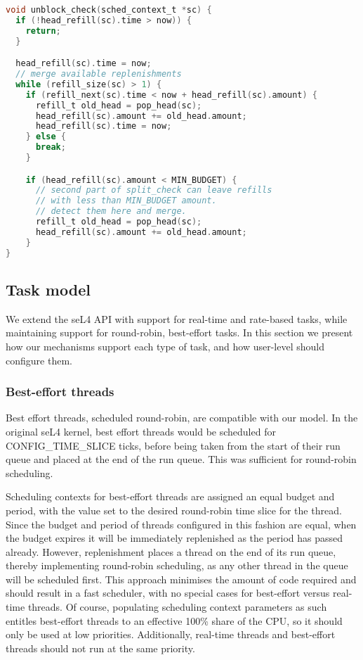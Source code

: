 \begin{lstlisting}[frame=single,language=c,caption=Unblock check routine.,label=list:unblock-check,float=htpb]
void unblock_check(sched_context_t *sc) {
  if (!head_refill(sc).time > now)) {
    return;
  }

  head_refill(sc).time = now;
  // merge available replenishments
  while (refill_size(sc) > 1) {
    if (refill_next(sc).time < now + head_refill(sc).amount) {
      refill_t old_head = pop_head(sc);
      head_refill(sc).amount += old_head.amount;
      head_refill(sc).time = now;
    } else {
      break;
    }

    if (head_refill(sc).amount < MIN_BUDGET) {
      // second part of split_check can leave refills
      // with less than MIN_BUDGET amount.
      // detect them here and merge.
      refill_t old_head = pop_head(sc);
      head_refill(sc).amount += old_head.amount;
    }
}
\end{lstlisting}


\subsection{Task model}

We extend the seL4 API with support for real-time and rate-based tasks, while maintaining support for round-robin, best-effort tasks.
In this section we present how our mechanisms support each type of task, and how user-level should configure them.

\subsubsection{Best-effort threads}

Best effort threads, scheduled round-robin, are compatible with our model.
In the original seL4 kernel, best effort threads would be scheduled for CONFIG\_TIME\_SLICE ticks, before being taken from the start of their run queue and placed at the end of the run queue.
This was sufficient for round-robin scheduling.

Scheduling contexts for best-effort threads are assigned an equal budget and period, with the value set to the desired round-robin time slice for the thread.
Since the budget and period of threads configured in this fashion are equal, when the budget expires it will be immediately replenished as the period has passed already.
However, replenishment places a thread on the end of its run queue, thereby implementing round-robin scheduling, as any other thread in the queue will be scheduled first.
This approach minimises the amount of code required and should result in a fast scheduler, with no special cases for best-effort versus real-time threads.
Of course, populating scheduling context parameters as such entitles best-effort threads to an effective 100\% share of the CPU, so it should only be used at low priorities.
Additionally, real-time threads and best-effort threads should not run at the same priority.

